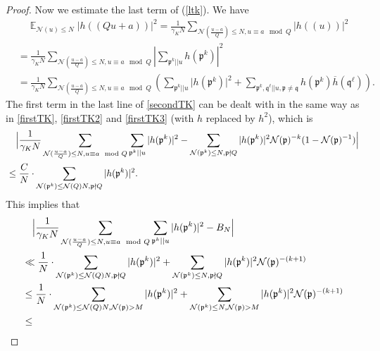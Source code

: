\documentclass[11pt]{amsart}
\theoremstyle{definition}
\DeclareMathOperator*{\E}{\mathbb{E}}
\newcommand{\NN}{{\mathcal N}}
\newcommand{\mf}{\mathfrak}
\begin{document}
\begin{proof}
Now we estimate the last term of (\ref{ltk}). We have
\begin{equation}\label{secondTK}
    \begin{split}
        &\quad \E_{\NN(u) \leq N}\vert h((Qu+a))\vert^{2}
        =\frac{1}{\gamma_{K} N}\sum_{\NN(\frac{u-a}{Q})\leq N, u\equiv a \mod Q}\vert h((u))\vert^{2}
        \\&=\frac{1}{\gamma_{K} N}\sum_{\NN(\frac{u-a}{Q})\leq N, u\equiv a \mod Q}\left| \sum_{\mf p^{k}|| u} h(\mf p^{k})\right|^{2}
        \\&=\frac{1}{\gamma_{K} N}\sum_{\NN(\frac{u-a}{Q})\leq N, u\equiv a \mod Q}\left(\sum_{\mf p^{k}|| u} \vert h(\mf p^{k})\vert^{2}+\sum_{\mf p^{k},\mf q^{\ell}|| u, \mf p\neq \mf q} h(\mf p^{k})\overline{h}(\mf q^{\ell})\right). 
    \end{split}
\end{equation}
The first term in the last line of \eqref{secondTK} can be dealt with in the same way as in \eqref{firstTK}, \eqref{firstTK2} and \eqref{firstTK3} (with $h$ replaced by $h^{2}$), which is  
\begin{equation}\nonumber
    \begin{split}
        &\quad \Bigl\vert\frac{1}{\gamma_{K} N}\sum_{\NN(\frac{u-a}{Q})\leq N, u\equiv a \mod Q}\sum_{\mf p^{k}|| u} \vert h(\mf p^{k})\vert^{2}-\sum_{\NN(\mf p^{k})\leq N,\mf p\nmid Q}\vert h(\mf p^{k})\vert^{2}\NN(\mf p)^{-k}(1-\NN(\mf p)^{-1})\Bigr\vert
        \\&\leq \frac{C}{N}\cdot\sum_{\NN(\mf p^{k})\leq \NN(Q)N, \mf p\nmid Q}\vert h(\mf p^{k})\vert^{2}.
    \end{split}
\end{equation}
This implies that 
\begin{equation}\label{secondTK2}
    \begin{split}
        &\quad \Bigl\vert\frac{1}{\gamma_{K} N}\sum_{\NN(\frac{u-a}{Q})\leq N, u\equiv a \mod Q}\sum_{\mf p^{k}|| u} \vert h(\mf p^{k})\vert^{2}-B_{N}\Bigr\vert
        \\&\ll \frac{1}{N}\cdot\sum_{\NN(\mf p^{k})\leq \NN(Q)N, \mf p\nmid Q}\vert h(\mf p^{k})\vert^{2}+\sum_{\NN(\mf p^{k})\leq N,\mf p\nmid Q}\vert h(\mf p^{k})\vert^{2}\NN(\mf p)^{-(k+1)}
      \\&\leq \frac{1}{N}\cdot\sum_{\NN(\mf p^{k})\leq \NN(Q)N, \NN(\mf p)>M}\vert h(\mf p^{k})\vert^{2}+\sum_{\NN(\mf p^{k})\leq N,\NN(\mf p)>M}\vert h(\mf p^{k})\vert^{2}\NN(\mf p)^{-(k+1)}
      \\&\leq  
    \end{split}

\end{equation}
\end{proof}
\end{document}
